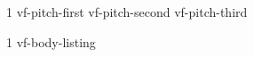 \documentclass{article}
\renewcommand\listinglabel[1]{%
  \llap{vf-label-{\scriptsize\rmfamily\the#1}{\normalsize\normalfont:}}\hskip\listingoffset\relax}
\begin{document}
\begin{listing}{1}
vf-pitch-first
vf-pitch-second
vf-pitch-third
\end{listing}
\renewcommand\listinglabel[1]{\llap{vf-body-\the#1}\hskip\listingoffset\relax}
\begin{listing}{1}
vf-body-listing
\end{listing}
\end{document}
